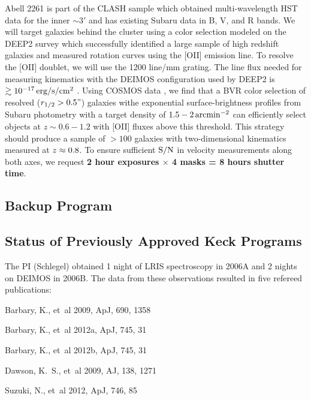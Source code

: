 \documentclass[12pt]{article}
\begin{document}
Abell 2261 is part of the CLASH sample \citep{Postman2012} which obtained multi-wavelength HST data for the inner $\sim3'$ and has existing Subaru data in B, V, and R bands. We will target galaxies behind the cluster using a color selection modeled on the DEEP2 survey \citep{Newman2013} which successfully identified a large sample of high redshift galaxies and measured rotation curves using the [OII] emission line. To resolve the [OII] doublet, we will use the 1200 line/mm grating. The line flux needed for measuring kinematics with the DEIMOS configuration used by DEEP2 is $\gtrsim10^{-17}\,{\rm erg/s/cm^2}$ \citep{Kassin2012}. Using COSMOS data \citep{Jouvel2009}, we find that a BVR color selection of resolved ($r_{1/2}>0.5"$) galaxies withe exponential surface-brightness profiles from Subaru photometry with a target density of $1.5-2\,{\rm arcmin^{-2}}$ can efficiently select objects at $z\sim0.6-1.2$ with [OII] fluxes above this threshold. This strategy should produce a sample of $>100$ galaxies with two-dimensional kinematics measured at $z_{\rm}\approx0.8$. To ensure sufficient ${\rm S/N}$ in velocity measurements along both axes, we request \textbf{2 hour exposures $\times$ 4 masks = 8 hours shutter time}.


\subsection{Backup Program}

\subsection{Status of Previously Approved Keck Programs}
The PI (Schlegel) obtained 1 night of LRIS spectroscopy in 2006A and 2 nights on DEIMOS in 2006B. The data from these observations resulted in five refereed publications:

{\small
\begin{description}
  \item {Barbary}, K., {et~al} 2009, ApJ, 690, 1358
  \item {Barbary}, K., {et~al} 2012a, ApJ, 745, 31
  \item {Barbary}, K., {et~al} 2012b, ApJ, 745, 31
  \item {Dawson}, K.~S., {et~al} 2009, AJ,  138, 1271
  \item {Suzuki}, N., {et~al} 2012, ApJ, 746, 85
\end{description}
}
\end{document}
